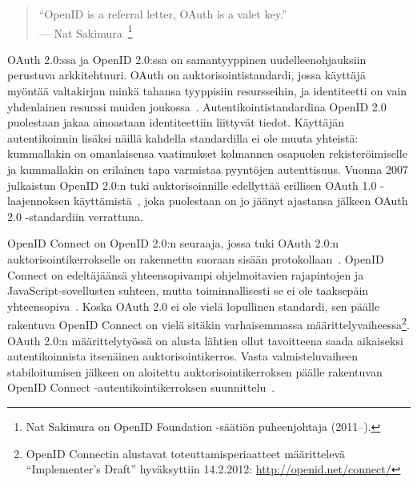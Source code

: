 \documentclass[finnish,gradu]{tktltiki}
\begin{document}
  \begin{quote}
    ``OpenID is a referral letter, OAuth is a valet key.''
    \\--- Nat Sakimura~\cite{sakimura_dummydiff_oauth_openid_2011}\footnote{Nat Sakimura on OpenID Foundation -säätiön puheenjohtaja (2011--).}
  \end{quote}

  OAuth 2.0:ssa ja OpenID 2.0:ssa on samantyyppinen uudelleenohjauksiin perustuva arkkitehtuuri. OAuth on auktorisointistandardi, jossa käyttäjä myöntää valtakirjan minkä tahansa tyyppisiin resursseihin, ja identiteetti on vain yhdenlainen resurssi muiden joukossa~\cite{sakimura_dummydiff_oauth_openid_2011}. Autentikointistandardina OpenID 2.0 puolestaan jakaa ainoastaan identiteettiin liittyvät tiedot. Käyttäjän autentikoinnin lisäksi näillä kahdella standardilla ei ole muuta yhteistä: kummallakin on omanlaisensa vaatimukset kolmannen osapuolen rekisteröimiselle ja kummallakin on erilainen tapa varmistaa pyyntöjen autenttisuus. Vuonna 2007 julkaistun OpenID 2.0:n tuki auktorisoinnille edellyttää erillisen OAuth 1.0 -laajennoksen käyttämistä~\cite{openid_2.0_oauth_hybrid_2009}, joka puolestaan on jo jäänyt ajastansa jälkeen OAuth 2.0 -standardiin verrattuna.

  OpenID Connect on OpenID 2.0:n seuraaja, jossa tuki OAuth 2.0:n auktorisointikerrokselle on rakennettu suoraan sisään protokollaan~\cite{openid_connect_specification_2012}. OpenID Connect on edeltäjäänsä yhteensopivampi ohjelmoitavien rajapintojen ja JavaScript-sovellusten suhteen, mutta  toiminnallisesti se ei ole taaksepäin yhteensopiva~\cite{sakimura_openid_connect_scopes_2011}. Koska OAuth 2.0 ei ole vielä lopullinen standardi, sen päälle rakentuva OpenID Connect on vielä sitäkin varhaisemmassa määrittelyvaiheessa\footnote{
  OpenID Connectin alustavat toteuttamisperiaatteet määrittelevä ``Implementer's Draft'' hyväksyttiin 14.2.2012: \url{http://openid.net/connect/}
  }. OAuth 2.0:n määrittelytyössä on alusta lähtien ollut tavoitteena saada aikaiseksi autentikoinnista itsenäinen auktorisointikerros. Vasta valmisteluvaiheen stabiloitumisen jälkeen on aloitettu auktorisointikerroksen päälle rakentuvan OpenID Connect -autentikointikerroksen suunnittelu~\cite{recordon_oauth20_initial_2010, shepard_oauth_facebook_2010}.

%
\end{document}
